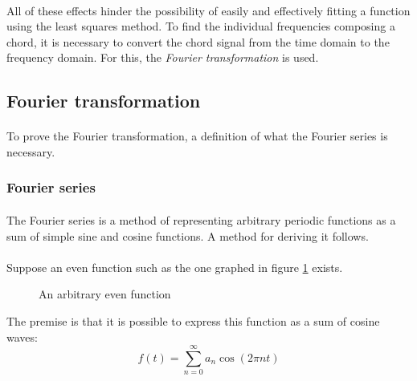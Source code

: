 \documentclass{article}
\begin{document}
\paragraph*{}
All of these effects hinder the possibility of easily and effectively fitting 
a function using the least squares method. To find the individual frequencies 
composing a chord, it is necessary to convert the chord signal from the time 
domain to the frequency domain. For this, the \textit{Fourier transformation} 
is used.

\subsection{Fourier transformation}

\paragraph*{}
To prove the Fourier transformation, a definition of what the Fourier series 
is necessary.

\subsubsection{Fourier series}

\paragraph*{}
The Fourier series is a method of representing arbitrary periodic functions as 
a sum of simple sine and cosine functions. A method for deriving it follows.

\paragraph*{}
Suppose an even function such as the one graphed in figure 
\ref{fig:odd-arb-func} exists.
\begin{figure}[ht]
	\centering
	\caption{An arbitrary even function}
	\label{fig:odd-arb-func}
\end{figure}

The premise is that it is possible to express this function as a sum of cosine 
waves:
$$f(t) = \sum^{\infty}_{n=0}a_n \cos(2 \pi n t)$$
\end{document}

